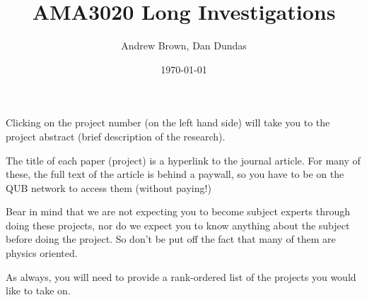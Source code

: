 \documentclass[11pt]{article}
\begin{document}
\title{\bf AMA3020 Long Investigations}
\author{Andrew Brown, Dan Dundas}
\date{\today}
\maketitle

\setlength{\parskip}{8pt}

Clicking on the project number (on the left hand side) will take you to the project abstract (brief description of the research). 

The title of each paper (project) is a hyperlink to the journal article. For many of these, the full text of the article is behind a paywall, so you have to be on the QUB network to access them (without paying!) 


Bear in mind that we are not expecting you to become subject experts through doing these projects, nor do we expect you to know anything about the subject before doing the project. So don't be put off the fact that many of them are physics oriented. 

As always, you will need to provide a rank-ordered list of the projects you would like to take on.

\setlength{\parskip}{-3pt}

\tableofcontents

\vspace{18pt}
\newpage
\setlength{\parskip}{0pt}









%


%















%
%
%
%




%
%
%


%
%

%
%
%
%



%
%












%
%
%



\end{document}
